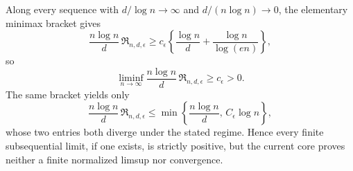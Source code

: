 Along every sequence with \(d/\log n\to\infty\) and \(d/(n\log n)\to0\), the elementary minimax bracket gives
\[
 \frac{n\log n}{d}\,\mathfrak R_{n,d,\epsilon}
 \ge c_\epsilon\left\{\frac{\log n}{d}+\frac{\log n}{\log(en)}\right\},
\]
so
\[
 \liminf_{n\to\infty}\frac{n\log n}{d}\,\mathfrak R_{n,d,\epsilon}\ge c_\epsilon>0.
\]
The same bracket yields only
\[
 \frac{n\log n}{d}\,\mathfrak R_{n,d,\epsilon}
 \le \min\left\{\frac{n\log n}{d},\,C_\epsilon\log n\right\},
\]
whose two entries both diverge under the stated regime. Hence every finite subsequential limit, if one exists, is strictly positive, but the current core proves neither a finite normalized limsup nor convergence.